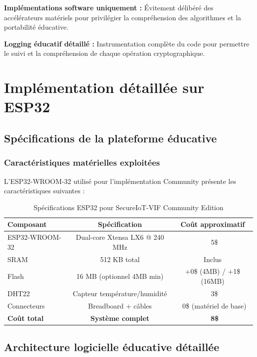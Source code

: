 \textbf{Implémentations software uniquement :} Évitement délibéré des accélérateurs matériels pour privilégier la compréhension des algorithmes et la portabilité éducative.

\textbf{Logging éducatif détaillé :} Instrumentation complète du code pour permettre le suivi et la compréhension de chaque opération cryptographique.

\section{Implémentation détaillée sur ESP32}

\subsection{Spécifications de la plateforme éducative}

\subsubsection{Caractéristiques matérielles exploitées}

L'ESP32-WROOM-32 utilisé pour l'implémentation Community présente les caractéristiques suivantes :

\begin{table}[h]
\centering
\caption{Spécifications ESP32 pour SecureIoT-VIF Community Edition}
\label{tab:esp32-community-specs}
\begin{tabular}{|l|c|c|}
\hline
\textbf{Composant} & \textbf{Spécification} & \textbf{Coût approximatif} \\
\hline
ESP32-WROOM-32 & Dual-core Xtensa LX6 @ 240 MHz & ~5\$ \\
SRAM & 512 KB total & Inclus \\
Flash & 16 MB (optionnel 4MB min) & +0\$ (4MB) / +1\$ (16MB) \\
DHT22 & Capteur température/humidité & ~3\$ \\
Connecteurs & Breadboard + câbles & ~0\$ (matériel de base) \\
\hline
\textbf{Coût total} & \textbf{Système complet} & \textbf{~8\$} \\
\hline
\end{tabular}
\end{table}

\subsection{Architecture logicielle éducative détaillée}

